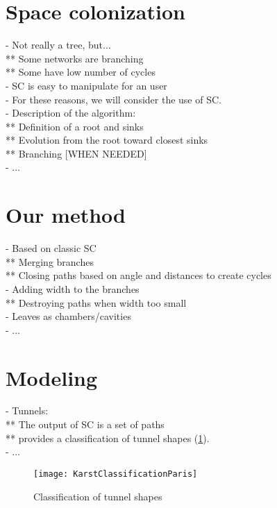 \section{Space colonization}
\label{sec:karsts_space-colonization}
- Not really a tree, but... \\
** Some networks are branching \\
** Some have low number of cycles \\
- SC is easy to manipulate for an user \\
- For these reasons, we will consider the use of SC. \\
- Description of the algorithm: \\
** Definition of a root and sinks \\
** Evolution from the root toward closest sinks \\
** Branching [WHEN NEEDED] \\
- ...

\section{Our method}
\label{sec:karsts_our-method}
- Based on classic SC \\
** Merging branches \\
** Closing paths based on angle and distances to create cycles \\
- Adding width to the branches \\
** Destroying paths when width too small \\
- Leaves as chambers/cavities \\
- ... 

\section{Modeling}
\label{sec:karsts_modeling}
- Tunnels: \\
** The output of SC is a set of paths \\
** \cite{Paris2021} provides a classification of tunnel shapes (\ref{fig:karsts_tunnel-classif}). \\
- ...

\begin{figure}
    \texttt{[image: KarstClassificationParis]}
    \caption{Classification of tunnel shapes}
    \label{fig:karsts_tunnel-classif}
\end{figure}

